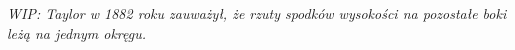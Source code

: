 
{
    \emph{WIP: Taylor w 1882 roku zauważył, że rzuty spodków wysokości na pozostałe boki leżą na jednym okręgu.}
}